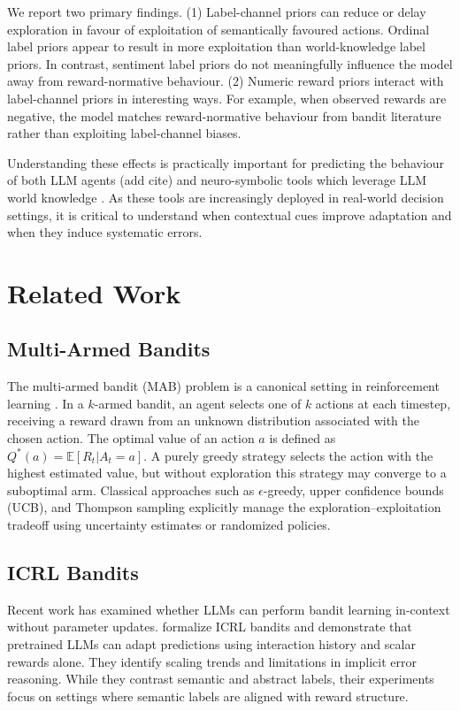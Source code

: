 \documentclass{article} %
\begin{document}
We report two primary findings. 
(1) Label-channel priors can reduce or delay exploration in favour of exploitation of semantically favoured actions. Ordinal label priors appear to result in more exploitation than world-knowledge label priors. In contrast, sentiment label priors do not meaningfully influence the model away from reward-normative behaviour.
(2) Numeric reward priors interact with label-channel priors in interesting ways. For example, when observed rewards are negative, the model matches reward-normative behaviour from bandit literature rather than exploiting label-channel biases.

Understanding these effects is practically important for predicting the behaviour of both LLM agents (add cite) and neuro-symbolic tools which leverage LLM world knowledge \citep{alamdari-jumpstart}. As these tools are increasingly deployed in real-world decision settings, it is critical to understand when contextual cues improve adaptation and when they induce systematic errors.

\section{Related Work}
\subsection*{Multi-Armed Bandits}
The multi-armed bandit (MAB) problem is a canonical setting in reinforcement learning \citep{suttonReinforcementLearningIntroduction2020}. In a $k$-armed bandit, an agent selects one of $k$ actions at each timestep, receiving a reward drawn from an unknown distribution associated with the chosen action. The optimal value of an action $a$ is defined as $Q^*(a) = \mathbb{E}[R_t|A_t = a]$. A purely greedy strategy selects the action with the highest estimated value, but without exploration this strategy may converge to a suboptimal arm. Classical approaches such as $\epsilon$-greedy, upper confidence bounds (UCB), and Thompson sampling explicitly manage the exploration–exploitation tradeoff using uncertainty estimates or randomized policies.

\subsection*{ICRL Bandits}
Recent work has examined whether LLMs can perform bandit learning in-context without parameter updates. \citet{monea_bandit} formalize ICRL bandits and demonstrate that pretrained LLMs can adapt predictions using interaction history and scalar rewards alone. They identify scaling trends and limitations in implicit error reasoning. While they contrast semantic and abstract labels, their experiments focus on settings where semantic labels are aligned with reward structure.
\end{document}
